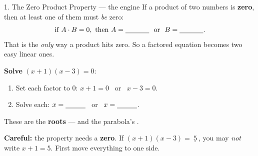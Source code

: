 \documentclass[10pt]{article}
\newcommand{\lgrid}[4]{%
  \draw[step=1, linegray!40, very thin] (#1,#3) grid (#2,#4);
  \draw[->, semithick, charcoal] (#1,0)--(#2,0) node[below right, font=\scriptsize]{$x$};
  \draw[->, semithick, charcoal] (0,#3)--(0,#4) node[left, font=\scriptsize]{$y$};}
\begin{document}
\boxguard[20]
\begin{notesbox}{1. The Zero Product Property --- the engine}
If a product of two numbers is \textbf{zero}, then at least one of them must \emph{be} zero:
\[ \text{if } A\cdot B = 0, \text{ then } A=\blank{1.2cm} \ \text{ or } \ B=\blank{1.2cm}. \]
That is the \emph{only} way a product hits zero. So a factored equation becomes two easy linear ones.
\begin{center}
\begin{minipage}{0.54\linewidth}
\textbf{Solve} $(x+1)(x-3)=0$:
\begin{enumerate}[leftmargin=1.6em, itemsep=2pt]
  \item Set each factor to $0$: \quad $x+1=0$ \ or \ $x-3=0$.
  \item Solve each: \quad $x=\blank{1.0cm}$ \ or \ $x=\blank{1.0cm}$.
\end{enumerate}
These are the \textbf{roots} --- and the parabola's \blank{2.6cm}.

\vspace{3pt}
\textbf{Careful:} the property needs a \textbf{zero}. If $(x+1)(x-3)=\underline{\ 5\ }$, you may
\emph{not} write $x+1=5$. First move everything to one side.
\end{minipage}%
\begin{minipage}{0.44\linewidth}\centering
{}
\end{minipage}
\end{center}
\end{notesbox}
\end{document}
